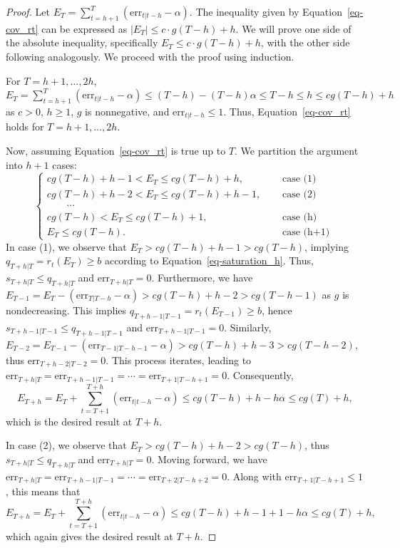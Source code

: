 \documentclass[
  11pt,
  a4paper,
]{article}
\theoremstyle{plain}
\theoremstyle{remark}
\begin{document}
\begin{proof}
Let \(E_T=\sum_{t=h+1}^{T}(\mathrm{err}_{t|t-h}-\alpha)\). The
inequality given by Equation~\ref{eq-cov_rt} can be expressed as
\(|E_T| \leq c \cdot g(T-h) + h\). We will prove one side of the
absolute inequality, specifically \(E_T \leq c \cdot g(T-h) + h\), with
the other side following analogously. We proceed with the proof using
induction.

For \(T=h+1,\ldots,2h\),
\(E_T = \sum_{t=h+1}^{T}(\mathrm{err}_{t|t-h}-\alpha) \leq (T-h)-(T-h)\alpha \leq T-h \leq h \leq cg(T-h) + h\)
as \(c>0\), \(h\geq 1\), \(g\) is nonnegative, and
\(\mathrm{err}_{t|t-h} \leq 1\). Thus, Equation~\ref{eq-cov_rt} holds
for \(T=h+1,\ldots,2h\).

Now, assuming Equation~\ref{eq-cov_rt} is true up to \(T\). We partition
the argument into \(h+1\) cases: \[
\begin{cases}
cg(T-h)+h-1 < E_T \leq cg(T-h)+h, & \quad \text { case (1) } \\
cg(T-h)+h-2 < E_T \leq cg(T-h)+h-1, & \quad \text { case (2) } \\
\qquad \cdots \\
cg(T-h) < E_T \leq cg(T-h)+1, & \quad \text { case (h) } \\
E_T \leq cg(T-h). & \quad \text { case (h+1) }
\end{cases}
\] In case (1), we observe that \(E_T > cg(T-h)+h-1 > cg(T-h)\),
implying \(q_{T+h|T} = r_t(E_{T}) \geq b\) according to
Equation~\ref{eq-saturation_h}. Thus, \(s_{T+h|T} \leq q_{T+h|T}\) and
\(\mathrm{err}_{T+h|T} = 0\). Furthermore, we have
\(E_{T-1} = E_T - (\mathrm{err}_{T|T-h} - \alpha) > cg(T-h)+h-2 > cg(T-h-1)\)
as \(g\) is nondecreasing. This implies
\(q_{T+h-1|T-1} = r_t(E_{T-1}) \geq b\), hence
\(s_{T+h-1|T-1} \leq q_{T+h-1|T-1}\) and
\(\mathrm{err}_{T+h-1|T-1} = 0\). Similarly,
\(E_{T-2} = E_{T-1} - (\mathrm{err}_{T-1|T-h-1} - \alpha) > cg(T-h)+h-3 > cg(T-h-2)\),
thus \(\mathrm{err}_{T+h-2|T-2} = 0\). This process iterates, leading to
\(\mathrm{err}_{T+h|T} = \mathrm{err}_{T+h-1|T-1} = \cdots = \mathrm{err}_{T+1|T-h+1} = 0\).
Consequently, \[
E_{T+h} = E_T+\sum_{t=T+1}^{T+h}(\mathrm{err}_{t|t-h}-\alpha) \leq cg(T-h)+h-h\alpha \leq cg(T)+h,
\] which is the desired result at \(T+h\).

In case (2), we observe that \(E_T > cg(T-h)+h-2 > cg(T-h)\), thus
\(s_{T+h|T} \leq q_{T+h|T}\) and \(\mathrm{err}_{T+h|T} = 0\). Moving
forward, we have
\(\mathrm{err}_{T+h|T} = \mathrm{err}_{T+h-1|T-1} = \cdots = \mathrm{err}_{T+2|T-h+2} = 0\).
Along with \(\mathrm{err}_{T+1|T-h+1} \leq 1\), this means that \[
E_{T+h} = E_T+\sum_{t=T+1}^{T+h}(\mathrm{err}_{t|t-h}-\alpha) \leq cg(T-h)+h-1+1-h\alpha \leq cg(T)+h,
\] which again gives the desired result at \(T+h\).


\end{proof}
\end{document}
